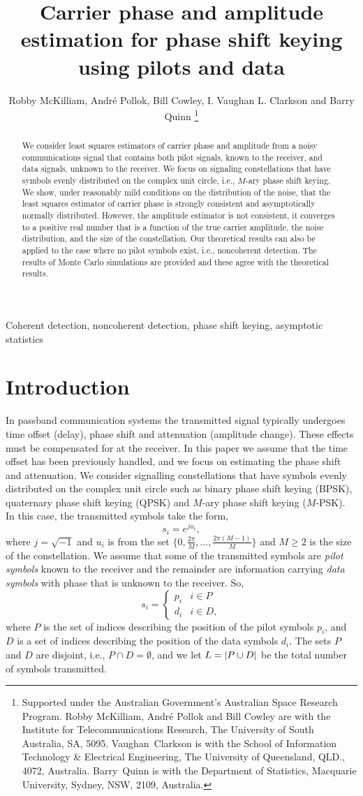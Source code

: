 \documentclass[journal]{IEEEtran}
\title{Carrier phase and amplitude estimation for phase shift keying using pilots and data}
\author{Robby McKilliam, Andr\'{e} Pollok, Bill Cowley, I. Vaughan L. Clarkson and Barry Quinn  
\thanks{
Supported under the Australian Government’s Australian Space Research Program.
Robby McKilliam, Andr\'{e} Pollok and Bill Cowley are with the Institute for Telecommunications Research, The University of South Australia, SA, 5095.  Vaughan~Clarkson is with the School of Information Technology \& Electrical Engineering, The University of Queensland, QLD., 4072, Australia.  Barry~Quinn is with the Department of Statistics, Macquarie University, Sydney, NSW, 2109, Australia.
}}
\begin{document}
\maketitle

\begin{abstract}
We consider least squares estimators of carrier phase and amplitude from a noisy communications signal that contains both pilot signals, known to the receiver, and data signals, unknown to the receiver.  We focus on signaling constellations that have symbols evenly distributed on the complex unit circle, i.e., $M$-ary phase shift keying.  We show, under reasonably mild conditions on the distribution of the noise, that the least squares estimator of carrier phase is strongly consistent and asymptotically normally distributed.  However, the amplitude estimator is not consistent, it converges to a positive real number that is a function of the true carrier amplitude, the noise distribution, and the size of the constellation.  Our theoretical results can also be applied to the case where no pilot symbols exist, i.e., noncoherent detection.  The results of Monte Carlo simulations are provided and these agree with the theoretical results.   
\end{abstract}
\begin{IEEEkeywords}
Coherent detection, noncoherent detection, phase shift keying, asymptotic statistics
\end{IEEEkeywords}

\section{Introduction}

In passband communication systems the transmitted signal typically undergoes time offset (delay), phase shift and attenuation (amplitude change).  These effects must be compensated for at the receiver. In this paper we assume that the time offset has been previously handled, and we focus on estimating the phase shift and attenuation.  We consider signalling constellations that have symbols evenly distributed on the complex unit circle such as binary phase shift keying (BPSK), quaternary phase shift keying (QPSK) and $M$-ary phase shift keying ($M$-PSK).  In this case, the transmitted symbols take the form,
\[
s_i = e^{j u_i},
\]
where $j = \sqrt{-1}$ and $u_i$ is from the set $\{0, \tfrac{2\pi}{M}, \dots, \tfrac{2\pi(M-1)}{M}\}$ and $M \geq 2$ is the size of the constellation.  We assume that some of the transmitted symbols are \emph{pilot symbols} known to the receiver and the remainder are information carrying \emph{data symbols} with phase that is unknown to the receiver.  So,
\[
s_i = \begin{cases}
p_i & i \in P \\
d_i & i \in D,
\end{cases}
\]
where $P$ is the set of indices describing the position of the pilot symbols $p_i$, and $D$ is a set of indices describing the position of the data symbols $d_i$.  The sets $P$ and $D$ are disjoint, i.e., $P \cap D = \emptyset$, and we let $L = {\left\vert P \cup D \right\vert}$ be the total number of symbols transmitted.
\end{document}
